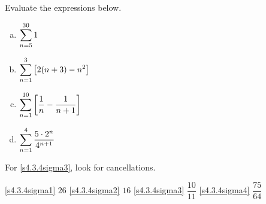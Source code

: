 \begin{question}
Evaluate the expressions below.
\begin{enumerate}[(a)]
\item\label{s4.3.4sigma1} $\displaystyle\sum_{n=5}^{30} 1$
\item\label{s4.3.4sigma2} $\displaystyle\sum_{n=1}^{3} \left[ 2(n+3)-n^2 \right]$
\item\label{s4.3.4sigma3} $\displaystyle\sum_{n=1}^{10} \left[\frac{1}{n}-\frac{1}{n+1}\right]$
\item\label{s4.3.4sigma4} $\displaystyle\sum_{n=1}^{4}\frac{5\cdot 2^n}{4^{n+1}} $
\end{enumerate}
\end{question}
\begin{hint}
For \eqref{s4.3.4sigma3}, look for cancellations.
\end{hint}
\begin{answer} \eqref{s4.3.4sigma1} $26$
\qquad \eqref{s4.3.4sigma2} $16$
\qquad \eqref{s4.3.4sigma3} $\dfrac{10}{11}$
\qquad \eqref{s4.3.4sigma4} $\dfrac{75}{64}$
\end{answer}
